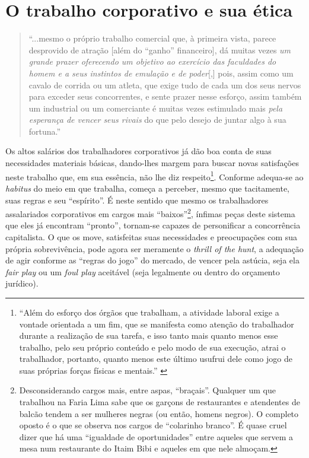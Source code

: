 \documentclass[12pt]{article}
\begin{document}
\section{O trabalho corporativo e sua ética}

\begin{quote}
    ``...mesmo o próprio trabalho comercial que, à primeira vista, parece desprovido de atração [além do ``ganho'' financeiro], dá muitas vezes \textit{um grande prazer oferecendo um objetivo ao exercício das faculdades do homem e a seus instintos de emulação e de poder}[,] pois, assim como um cavalo de corrida ou um atleta, que exige tudo de cada um dos seus nervos para exceder seus concorrentes, e sente prazer nesse esforço, assim também um industrial ou um comerciante é muitas vezes estimulado mais \textit{pela esperança de vencer seus rivais} do que pelo desejo de juntar algo à sua fortuna.'' \cite[p. 39; grifo meu]{Marshall1985}
\end{quote}

Os altos salários dos trabalhadores corporativos já dão boa conta de suas necessidades materiais básicas, dando-lhes margem para buscar novas satisfações neste trabalho que, em sua essência, não lhe diz respeito\footnote{``Além do esforço dos órgãos que trabalham, a atividade laboral exige a vontade orientada a um fim, que se manifesta como atenção do trabalhador durante a realização de sua tarefa, e isso tanto mais quanto menos esse trabalho, pelo seu próprio conteúdo e pelo modo de sua execução, atrai o trabalhador, portanto, quanto menos este último usufrui dele como jogo de suas próprias forças físicas e mentais.'' \cite[p. 256]{Marx2017}}. Conforme adequa-se ao \textit{habitus} do meio em que trabalha, começa a perceber, mesmo que tacitamente, suas regras e seu ``espírito''. É neste sentido que mesmo os trabalhadores assalariados corporativos em cargos mais ``baixos''\footnote{Desconsiderando cargos mais, entre aspas, ``braçais''. Qualquer um que trabalhou na Faria Lima sabe que os garçons de restaurantes e atendentes de balcão tendem a ser mulheres negras (ou então, homens negros). O completo oposto é o que se observa nos cargos de ``colarinho branco''. É quase cruel dizer que há uma ``igualdade de oportunidades'' entre aqueles que servem a mesa num restaurante do Itaim Bibi e aqueles em que nele almoçam.}, ínfimas peças deste sistema que eles já encontram ``pronto'', tornam-se capazes de personificar a concorrência capitalista. O que os move, satisfeitas suas necessidades e preocupações com sua própria sobrevivência, pode agora ser meramente o \textit{thrill of the hunt}, a adequação de agir conforme as ``regras do jogo'' do mercado, de vencer pela astúcia, seja ela \textit{fair play} ou um \textit{foul play} aceitável (seja legalmente ou dentro do orçamento jurídico). 
\end{document}
